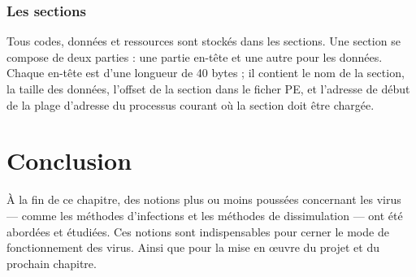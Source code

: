     \subsubsection{Les sections}
    Tous codes, données et ressources sont stockés dans les sections. Une section se compose de deux 
    parties : une partie en-tête et une autre pour les données. Chaque en-tête est d'une longueur de 40 
    bytes ; il contient le nom de la section, la taille des données, l'offset de la section dans 
    le ficher PE, et l'adresse de début de la plage d'adresse du processus courant où la section doit être 
    chargée. \cite{pe4}

\section{Conclusion}
À la fin de ce chapitre, des notions plus ou moins poussées concernant les virus --- comme les méthodes d'infections 
et les méthodes de dissimulation --- ont été abordées et étudiées. Ces notions sont indispensables pour cerner le 
mode de fonctionnement des virus. Ainsi que pour la mise en œuvre du projet et du prochain chapitre. %
